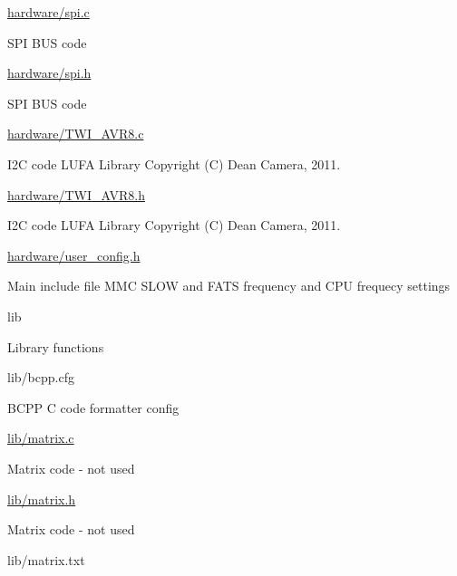 \begin{DoxyItemize}
\begin{DoxyItemize}
\item \hyperlink{spi_8c}{hardware/spi.\+c}
\begin{DoxyItemize}
\item S\+PI B\+US code
\end{DoxyItemize}
\item \hyperlink{spi_8h}{hardware/spi.\+h}
\begin{DoxyItemize}
\item S\+PI B\+US code
\end{DoxyItemize}
\item \hyperlink{TWI__AVR8_8c}{hardware/\+T\+W\+I\+\_\+\+A\+V\+R8.\+c}
\begin{DoxyItemize}
\item I2C code L\+U\+FA Library Copyright (C) Dean Camera, 2011.
\end{DoxyItemize}
\item \hyperlink{TWI__AVR8_8h}{hardware/\+T\+W\+I\+\_\+\+A\+V\+R8.\+h}
\begin{DoxyItemize}
\item I2C code L\+U\+FA Library Copyright (C) Dean Camera, 2011.
\end{DoxyItemize}
\item \hyperlink{user__config_8h}{hardware/user\+\_\+config.\+h}
\begin{DoxyItemize}
\item Main include file M\+MC S\+L\+OW and F\+A\+TS frequency and C\+PU frequecy settings
\end{DoxyItemize}
\end{DoxyItemize}
\item lib
\begin{DoxyItemize}
\item Library functions
\item lib/bcpp.\+cfg
\begin{DoxyItemize}
\item B\+C\+PP C code formatter config
\end{DoxyItemize}
\item \hyperlink{matrix_8c}{lib/matrix.\+c}
\begin{DoxyItemize}
\item Matrix code -\/ not used
\end{DoxyItemize}
\item \hyperlink{matrix_8h}{lib/matrix.\+h}
\begin{DoxyItemize}
\item Matrix code -\/ not used
\end{DoxyItemize}
\item lib/matrix.\+txt

\end{DoxyItemize}
\end{DoxyItemize}
